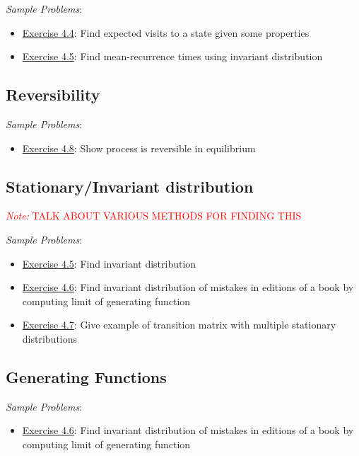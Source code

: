 \documentclass[12pt]{article}
\newcommand{\note}[1]{\textcolor{red}{\textit{Note:} #1}}
\begin{document}
\textit{Sample Problems}: 
\begin{itemize}[nolistsep]
    \item \hyperref[Exercise 4.4]{Exercise 4.4}: Find expected visits to a state given some properties
    \item \hyperref[Exercise 4.5]{Exercise 4.5}: Find mean-recurrence times using invariant distribution
\end{itemize}

\subsection{Reversibility}
\textit{Sample Problems}: 
\begin{itemize}[nolistsep]
    \item \hyperref[Exercise 4.8]{Exercise 4.8}: Show process is reversible in equilibrium
\end{itemize}


\subsection{Stationary/Invariant distribution}

\note{TALK ABOUT VARIOUS METHODS FOR FINDING THIS}

\textit{Sample Problems}: 
\begin{itemize}[nolistsep]
    \item \hyperref[Exercise 4.5]{Exercise 4.5}: Find invariant distribution
    \item \hyperref[Exercise 4.6]{Exercise 4.6}: Find invariant distribution of mistakes in editions of a book by computing limit of generating function
    \item \hyperref[Exercise 4.7]{Exercise 4.7}: Give example of transition matrix with multiple stationary distributions
\end{itemize}

\subsection{Generating Functions}
\textit{Sample Problems}: 
\begin{itemize}[nolistsep]
    \item \hyperref[Exercise 4.6]{Exercise 4.6}: Find invariant distribution of mistakes in editions of a book by computing limit of generating function
\end{itemize}
\end{document}

